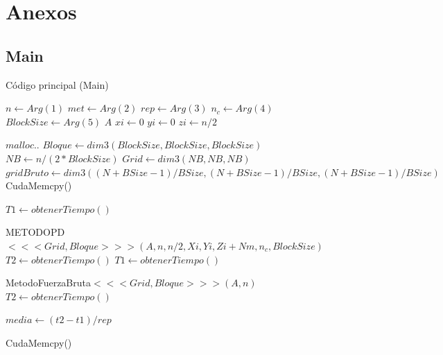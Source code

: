 \documentclass[10pt, conference, compsocconf, onecolumn]{IEEEtran}
\begin{document}


%
%
%
%




\section*{Anexos}
\label{sec_anexo}
\subsection{Main}
\label{ssec_Main}
\begin{algorithm}[H]
	\centering
	\caption{C\'odigo principal (Main)}
	
	\begin{algorithmic}
		\State $n\gets Arg(1) $
		\State $met\gets Arg(2)$
		\State $rep\gets Arg(3)$
		\State $n_{c}\gets Arg(4)$
		\State $BlockSize\gets Arg(5)$
		\State $A$
		\State $xi\gets 0$
		\State $yi\gets 0$
		\State $zi\gets n/2$
		
		\State $malloc..$ 
		\State $Bloque\gets dim3(BlockSize,BlockSize,BlockSize)$
		\State $NB\gets n/(2*BlockSize)$
		\State $Grid\gets dim3(NB,NB,NB)$
		\State $gridBruto\gets dim3((N+BSize-1)/BSize,(N+BSize-1)/BSize,(N+BSize-1)/BSize)$
		\State CudaMemcpy() 
		
		\State $T1\gets obtenerTiempo()$
		
		\State METODOPD$<<<Grid,Bloque>>>(A,n,n/2,Xi,Yi,Zi+Nm,n_{c},BlockSize)$
		\EndFor
		\State $T2\gets obtenerTiempo()$
		\EndIf
		\State $T1\gets obtenerTiempo()$
		
		\State MetodoFuerzaBruta$<<<Grid,Bloque>>>(A,n)$
		\EndFor
		\State $T2\gets obtenerTiempo()$
		
		\State $media\gets (t2-t1)/rep $
		
		\State CudaMemcpy() 
		
		
		
		\EndIf\
		\EndFunction
	\end{algorithmic}
\end{algorithm}
\end{document}
